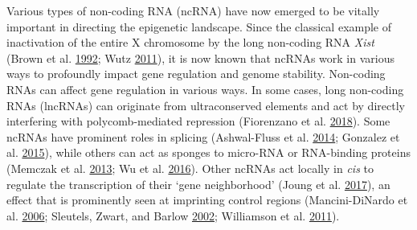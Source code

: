 \documentclass[onehalf,12pt]{beavtex}
\begin{document}
  Various types of non-coding RNA (ncRNA) have now emerged to be vitally
  important in directing the epigenetic landscape. Since the classical
  example of inactivation of the entire X chromosome by the long
  non-coding RNA \emph{Xist} (Brown et al.
  \protect\hyperlink{ref-BrownhumanXISTgene1992}{1992}; Wutz
  \protect\hyperlink{ref-WutzGenesilencingXchromosome2011}{2011}), it is
  now known that ncRNAs work in various ways to profoundly impact gene
  regulation and genome stability. Non-coding RNAs can affect gene
  regulation in various ways. In some cases, long non-coding RNAs
  (lncRNAs) can originate from ultraconserved elements and act by directly
  interfering with polycomb-mediated repression (Fiorenzano et al.
  \protect\hyperlink{ref-FiorenzanoUltraconservedElementContaining2018}{2018}).
  Some ncRNAs have prominent roles in splicing (Ashwal-Fluss et al.
  \protect\hyperlink{ref-Ashwal-FlusscircRNABiogenesisCompetes2014}{2014};
  Gonzalez et al.
  \protect\hyperlink{ref-GonzalezlncRNAregulatesalternative2015}{2015}),
  while others can act as sponges to micro-RNA or RNA-binding proteins
  (Memczak et al.
  \protect\hyperlink{ref-MemczakCircularRNAsare2013}{2013}; Wu et al.
  \protect\hyperlink{ref-WuUnusualProcessingGenerates2016}{2016}). Other
  ncRNAs act locally in \emph{cis} to regulate the transcription of their
  `gene neighborhood' (Joung et al.
  \protect\hyperlink{ref-JoungGenomescaleactivationscreen2017}{2017}), an
  effect that is prominently seen at imprinting control regions
  (Mancini-DiNardo et al.
  \protect\hyperlink{ref-Mancini-DiNardoElongationKcnq1ot1transcript2006}{2006};
  Sleutels, Zwart, and Barlow
  \protect\hyperlink{ref-SleutelsnoncodingAirRNA2002}{2002}; Williamson et
  al.
  \protect\hyperlink{ref-WilliamsonUncouplingAntisenseMediatedSilencing2011a}{2011}).
  
\end{document}
